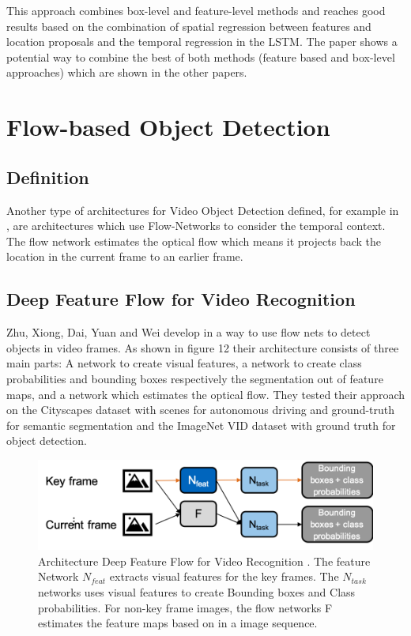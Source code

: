 \documentclass[conference]{IEEEtran}
\begin{document}
This approach combines box-level and feature-level methods and reaches good results based on the combination of spatial regression between features and location proposals and the temporal regression in the LSTM. The paper shows a potential way to combine the best of both methods (feature based and box-level approaches) which are shown in the other papers. 

\section{Flow-based Object Detection}

\subsection{Definition}
Another type  of architectures for Video Object Detection defined, for example in \cite{b3}, are architectures which use Flow-Networks to consider the temporal context. The flow network estimates the optical flow which means it projects back the location in the current frame to an earlier frame. 

\subsection{Deep Feature Flow for Video Recognition \cite{b3}}
Zhu, Xiong, Dai, Yuan and Wei develop in \cite{b2} a way to use flow nets to detect objects in video frames. As shown in figure 12 their architecture consists of three main parts: A network to create visual features, a network to create class probabilities and bounding boxes respectively the segmentation out of feature maps, and a network which estimates the optical flow. They tested their approach on the Cityscapes dataset \cite{b56}  with scenes for autonomous driving and ground-truth for semantic segmentation and the ImageNet VID dataset \cite{b35} with ground truth for object detection.

\begin{figure} [h]
\includegraphics[width=\columnwidth]{Flow}
\caption{Architecture Deep Feature Flow for Video Recognition \cite{b3}. The feature Network $N_{feat}$ extracts visual features for the key frames. The $N_{task}$ networks uses visual features to create Bounding boxes and Class probabilities. For non-key frame images, the flow networks F estimates the feature maps based on in a image sequence.} 
\end{figure}
\end{document}
